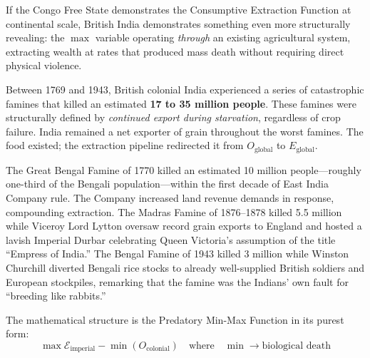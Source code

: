 If the Congo Free State demonstrates the Consumptive Extraction Function at continental scale, British India demonstrates something even more structurally revealing: the $\max$ variable operating \textit{through} an existing agricultural system, extracting wealth at rates that produced mass death without requiring direct physical violence.

Between 1769 and 1943, British colonial India experienced a series of catastrophic famines that killed an estimated \textbf{17 to 35 million people}. These famines were structurally defined by \textit{continued export during starvation}, regardless of crop failure. India remained a net exporter of grain throughout the worst famines. The food existed; the extraction pipeline redirected it from $O_{\text{global}}$ to $E_{\text{global}}$.

The Great Bengal Famine of 1770 killed an estimated 10 million people---roughly one-third of the Bengali population---within the first decade of East India Company rule. The Company increased land revenue demands in response, compounding extraction. The Madras Famine of 1876--1878 killed 5.5 million while Viceroy Lord Lytton oversaw record grain exports to England and hosted a lavish Imperial Durbar celebrating Queen Victoria's assumption of the title ``Empress of India.'' The Bengal Famine of 1943 killed 3 million while Winston Churchill diverted Bengali rice stocks to already well-supplied British soldiers and European stockpiles, remarking that the famine was the Indians' own fault for ``breeding like rabbits.''

The mathematical structure is the Predatory Min-Max Function in its purest form:
\begin{equation}\label{eq:13.2-global-predatory-minmax}
\max \mathcal{E}_{\text{imperial}} - \min(O_{\text{colonial}}) \quad \text{where} \quad \min \rightarrow \text{biological death}
\end{equation}

